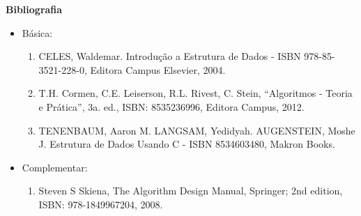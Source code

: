 

\begin{snugshade}\begin{center}\textbf{
    Bibliografia
}\end{center}\end{snugshade}

\begin{itemize} 
  \item Básica:
	\begin{enumerate}
	\item CELES, Waldemar. Introdução a Estrutura de Dados -  ISBN 978-85-3521-228-0, Editora Campus Elsevier, 2004.
	\item T.H. Cormen, C.E. Leiserson, R.L. Rivest, C. Stein, ``Algoritmos - Teoria e Prática'', 3a. ed., ISBN: 8535236996, Editora Campus, 2012.
	\item TENENBAUM, Aaron M. LANGSAM, Yedidyah. AUGENSTEIN, Moshe J. Estrutura de Dados Usando C - ISBN 8534603480, Makron Books. 
	
	\end{enumerate}
  \item Complementar:
	\begin{enumerate} 
	\item Steven S Skiena, The Algorithm Design Manual, Springer; 2nd edition, ISBN: 978-1849967204, 2008.\\
	\end{enumerate}
\end{itemize}
